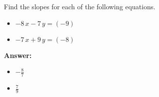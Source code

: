  Find the slopes for each of the following equations. \begin{itemize}\item \( -8 \, x - 7 \, y = \left(-9\right) \)\item \( -7 \, x + 9 \, y = \left(-8\right) \)\end{itemize}

        \textbf{Answer:} \begin{itemize}\item \( -\frac{8}{7} \)\item \( \frac{7}{9} \)\end{itemize}
